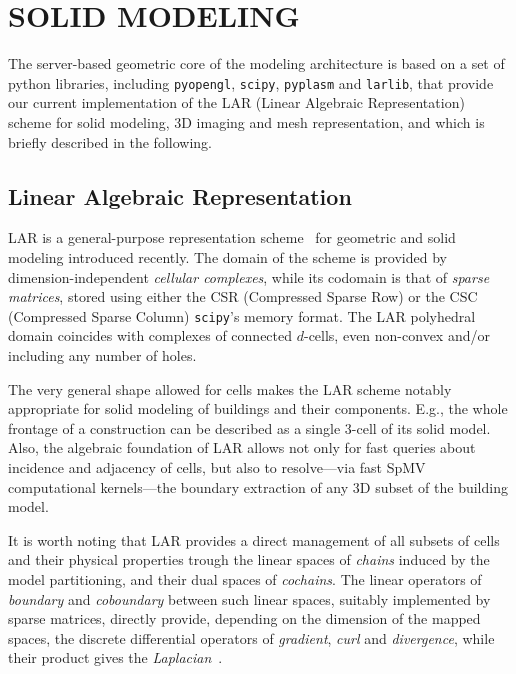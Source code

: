 \section{\uppercase{Solid Modeling}}
\label{sec:modeling}

\noindent
The server-based geometric core of the modeling architecture is based on a set of python libraries, including \texttt{pyopengl}, \texttt{scipy}, \texttt{pyplasm} and \texttt{larlib}, that provide our current implementation of the LAR (Linear Algebraic Representation) scheme for solid modeling, 3D imaging and mesh representation, and which is briefly described in the following.

\vspace{-3mm}\subsection{Linear Algebraic Representation}\vspace{-3mm}

LAR is a general-purpose representation scheme~\cite{Dicarlo:2014:TNL:2543138.2543294} for geometric and solid modeling introduced recently. The domain of the scheme is provided by dimension-independent \emph{cellular complexes}, while its codomain is that of \emph{sparse matrices}, stored using either the CSR (Compressed Sparse Row) or the CSC (Compressed Sparse Column) \texttt{scipy}'s memory format. The LAR polyhedral domain coincides with complexes of connected $d$-cells, even non-convex and/or including any number of holes. 

The very general shape allowed for cells makes the LAR scheme notably appropriate for solid modeling of buildings and their components. E.g., the whole frontage of a construction can be described as a single 3-cell of its solid model. Also, the algebraic foundation of LAR allows not only for fast queries about incidence and adjacency of cells, but also to resolve---via fast SpMV computational kernels---the boundary extraction of any 3D subset of the building model. 

It is worth noting that LAR provides a direct management of all subsets of cells and their physical properties trough the linear spaces of \emph{chains} induced by the model partitioning, and their dual spaces of \emph{cochains}. The linear operators of \emph{boundary} and \emph{coboundary} between such linear spaces, suitably implemented by sparse matrices, directly provide, depending on the dimension of the mapped spaces, the discrete differential operators of \emph{gradient}, \emph{curl} and \emph{divergence}, while their product gives the \emph{Laplacian}~\cite{ieee-tase}.  

